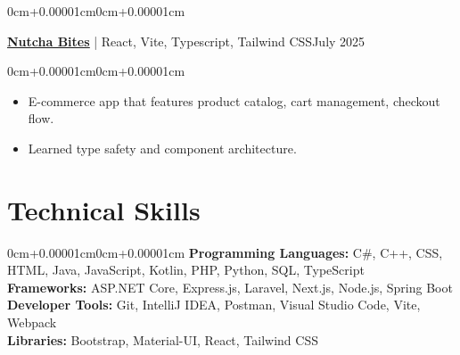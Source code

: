 \documentclass[10pt, letterpaper]{article}
\newenvironment{highlights}{\begin{itemize}[topsep=0.10cm,parsep=0.10cm,partopsep=0pt,itemsep=0pt,leftmargin=0cm+10pt]}{\end{itemize}}
\newenvironment{onecolentry}{\begin{adjustwidth}{0cm+0.00001cm}{0cm+0.00001cm}}{\end{adjustwidth}}
\newenvironment{twocolentry}[2][]{\onecolentry\def\secondColumn{#2}\setcolumnwidth{\fill,5cm}\begin{paracol}{2}}{\switchcolumn \raggedleft \secondColumn\end{paracol}\endonecolentry}
\begin{document}
    \vspace{0.15cm}
    \begin{twocolentry}{July 2025}
        \textbf{\underline{\href{https://nutcha-bites.vercel.app/}{Nutcha Bites}}} | React, Vite, Typescript, Tailwind CSS\end{twocolentry}
    \vspace{0.10cm}
    \begin{onecolentry}
        \begin{highlights}
            \item E-commerce app that features product catalog, cart management, checkout flow.
            \item Learned type safety and component architecture.
        \end{highlights}
    \end{onecolentry}
    \vspace{0.15cm}

\section{Technical Skills}
\begin{onecolentry}
    \textbf{Programming Languages:} C\#, C++, CSS, HTML, Java, JavaScript, Kotlin, PHP, Python, SQL, TypeScript \\
    \vspace{0.10cm}
    \textbf{Frameworks:} ASP.NET Core, Express.js, Laravel, Next.js, Node.js, Spring Boot \\
    \vspace{0.10cm}
    \textbf{Developer Tools:} Git, IntelliJ IDEA, Postman, Visual Studio Code, Vite, Webpack \\
    \vspace{0.10cm}
    \textbf{Libraries:} Bootstrap, Material-UI, React, Tailwind CSS \\
    \vspace{0.10cm}

\end{onecolentry}
\end{document}
